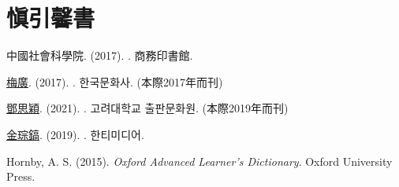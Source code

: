 \chapter{愼引馨書}
\par 中國社會科學院. (2017). . 商務印書館.
\par \underline{梅廣}. (2017). . 한국문화사. (本際2017年而刊)
\par \underline{鄧思穎}. (2021). . 고려대학교 출판문화원. (本際2019年而刊)
\par \underline{金琮鎬}. (2019). . 한티미디어.
\par Hornby, A. S. (2015). \textit{Oxford Advanced Learner's Dictionary}. Oxford University Press.
